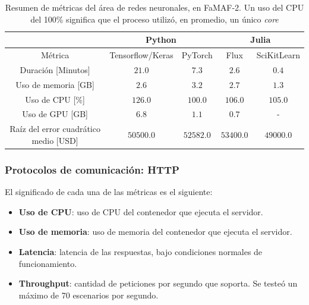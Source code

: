 \documentclass[11pt]{article}
\let\Oldsubsubsection\subsubsection
\renewcommand{\subsubsection}{\FloatBarrier\Oldsubsubsection}
\newcommand{\english}[1]{\textit{#1}}
\begin{document}
\begin{table}[H]
\centering
\begin{tabular}{|c|c|c|c|c|}
\hline
& \multicolumn{2}{c|}{Python} & \multicolumn{2}{c|}{Julia} \\ \hline
Métrica & Tensorflow/Keras & PyTorch & Flux & SciKitLearn \\ \hline
Duración [Minutos] & $21.0$ & $7.3$ & $2.6$ & $0.4$ \\ \hline
Uso de memoria [GB] & $2.6$ & $3.2$ & $2.7$ & $1.3$ \\ \hline
Uso de CPU [\%] & $126.0$ & $100.0$& $106.0$& $105.0$\\ \hline
Uso de GPU [GB] & $6.8$ & $1.1$ & $0.7$ & - \\ \hline
Raíz del error cuadrático medio [USD] & $50500.0$ & $52582.0$ & $53400.0$ & $49000.0$ \\ \hline
\end{tabular}
\caption{Resumen de métricas del área de redes neuronales, en FaMAF-2. Un uso del CPU del 100\% significa que el proceso utilizó, en promedio, un único \english{core}}
\label{tab:nn:famaf_2}
\end{table}

\subsubsection{Protocolos de comunicación: HTTP}

El significado de cada una de las métricas es el siguiente:

\begin{itemize}
    \item \textbf{Uso de CPU}: uso de CPU del contenedor que ejecuta el servidor.
    \item \textbf{Uso de memoria}: uso de memoria del contenedor que ejecuta el servidor.
    \item \textbf{Latencia}: latencia de las respuestas, bajo condiciones normales de funcionamiento.
    \item \textbf{Throughput}: cantidad de peticiones por segundo que soporta. Se testeó un máximo de 70 escenarios por segundo.
\end{itemize}
\end{document}

